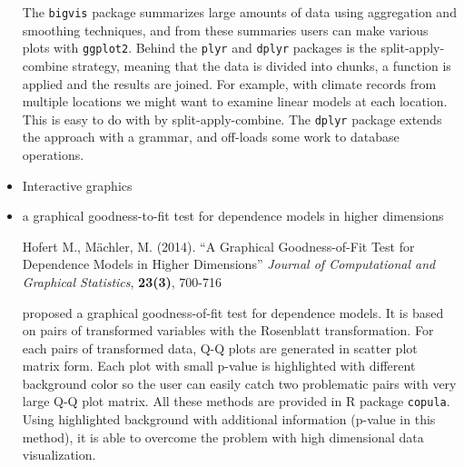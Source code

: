 \documentclass{article}
\begin{document}
\begin{itemize}
The {\tt bigvis} package \citep{bigvis} summarizes large amounts of data using aggregation and smoothing techniques, and from these summaries users can make various plots with {\tt ggplot2}. Behind the {\tt plyr} \citep{plyr} and {\tt dplyr} \citep{dplyr} packages is the split-apply-combine strategy, meaning that the data is divided into chunks, a function is applied and the results are joined. For example, with climate records from multiple locations we might want to examine linear models at each location. This is easy to do with by split-apply-combine. The {\tt dplyr} package extends the approach with a grammar, and off-loads some work to database operations. 


\item Interactive graphics


\item a graphical goodness-to-fit test for dependence models in higher dimensions

Hofert M., M\"{a}chler, M. (2014).
``A Graphical Goodness-of-Fit Test for
Dependence Models in Higher Dimensions''
{\em Journal of Computational and Graphical Statistics}, {\bf 23(3)}, 700-716
\citep{hofert2013graphical}

\citet{hofert2013graphical} proposed a graphical goodness-of-fit test for dependence models.
It is based on pairs of transformed variables with the Rosenblatt transformation. For each pairs of transformed data, Q-Q plots are generated in scatter plot matrix form. Each plot with small p-value is highlighted with different background color so the user can easily catch two problematic pairs with very large Q-Q plot matrix. All these methods are provided in R package {\tt copula}. Using highlighted background with additional information (p-value in this method), it is able to overcome the problem with high dimensional data visualization.



\end{itemize}
\end{document}
